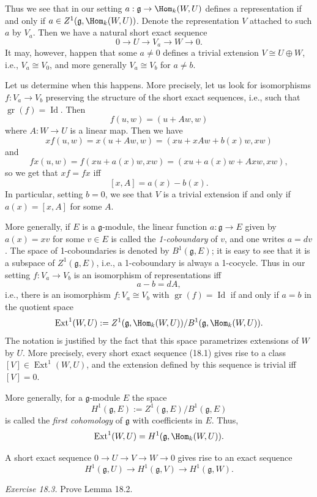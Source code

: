 Thus we see that in our setting $a:\mathfrak g\to\Hom_k(W,U)$ defines a representation if and only if $a\in Z^1(\mathfrak g,\Hom_k(W,U))$. Denote the representation $V$ attached to such $a$ by $V_a$. Then we have a natural short exact sequence
\[
0\to U\to V_a\to W\to0.
\]
It may, however, happen that some $a\ne0$ defines a trivial extension $V\cong U\oplus W$, i.e., $V_a\cong V_0$, and more generally $V_a\cong V_b$ for $a\ne b$.

Let us determine when this happens. More precisely, let us look for isomorphisms $f:V_a\to V_b$ preserving the structure of the short exact sequences, i.e., such that $\operatorname{gr}(f)=\operatorname{Id}$. Then
\[
f(u,w)=(u+Aw,w)
\]
where $A:W\to U$ is a linear map. Then we have
\[
xf(u,w)=x(u+Aw,w)=(xu+xAw+b(x)w,xw)
\]
and
\[
fx(u,w)=f(xu+a(x)w,xw)=(xu+a(x)w+Axw,xw),
\]
so we get that $xf=fx$ iff
\[
[x,A]=a(x)-b(x).
\]
In particular, setting $b=0$, we see that $V$ is a trivial extension if and only if $a(x)=[x,A]$ for some $A$.

More generally, if $E$ is a $\mathfrak g$-module, the linear function $a:\mathfrak g\to E$ given by $a(x)=xv$ for some $v\in E$ is called the \emph{1-coboundary} of $v$, and one writes $a=dv$. The space of 1-coboundaries is denoted by $B^1(\mathfrak g,E)$; it is easy to see that it is a subspace of $Z^1(\mathfrak g,E)$, i.e., a 1-coboundary is always a 1-cocycle. Thus in our setting $f:V_a\to V_b$ is an isomorphism of representations iff
\[
a-b=dA,
\]
i.e., there is an isomorphism $f:V_a\cong V_b$ with $\operatorname{gr}(f)=\operatorname{Id}$ if and only if $a=b$ in the quotient space
\[
\operatorname{Ext}^1(W,U):=Z^1(\mathfrak g,\Hom_k(W,U))/B^1(\mathfrak g,\Hom_k(W,U)).
\]
The notation is justified by the fact that this space parametrizes extensions of $W$ by $U$. More precisely, every short exact sequence (18.1) gives rise to a class $[V]\in\operatorname{Ext}^1(W,U)$, and the extension defined by this sequence is trivial iff $[V]=0$.

More generally, for a $\mathfrak g$-module $E$ the space
\[
H^1(\mathfrak g,E):=Z^1(\mathfrak g,E)/B^1(\mathfrak g,E)
\]
is called the \emph{first cohomology} of $\mathfrak g$ with coefficients in $E$. Thus,
\[
\operatorname{Ext}^1(W,U)=H^1(\mathfrak g,\Hom_k(W,U)).
\]

\begin{lemma}
A short exact sequence $0\to U\to V\to W\to0$ gives rise to an exact sequence
\[
H^1(\mathfrak g,U)\longrightarrow H^1(\mathfrak g,V)\longrightarrow H^1(\mathfrak g,W).
\]
\end{lemma}
\noindent\emph{Exercise 18.3.} Prove Lemma 18.2.

